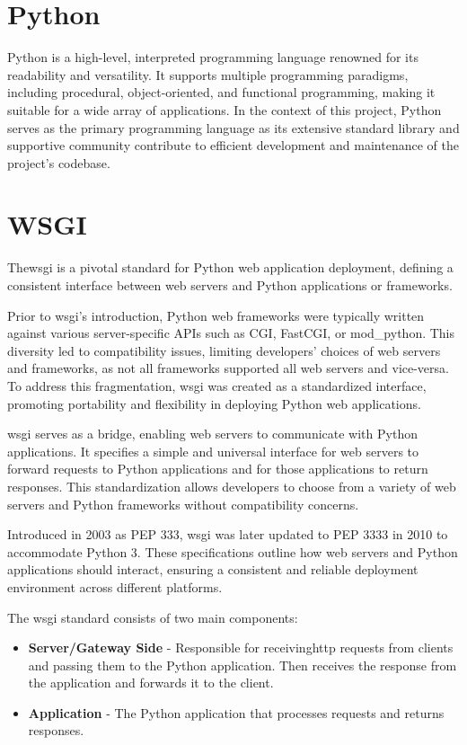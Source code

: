 \section{Python}
Python is a high-level, interpreted programming language renowned for its readability and versatility. It supports 
multiple programming paradigms, including procedural, object-oriented, and functional programming, making it suitable 
for a wide array of applications.
In the context of this project, Python serves as the primary programming language as its extensive standard library 
and supportive community contribute to efficient development and maintenance of the project's codebase.

\section{WSGI}
The\ac{wsgi} is a pivotal standard for Python web application deployment, defining a consistent interface between web 
servers and Python applications or frameworks.

Prior to \ac{wsgi}'s introduction, Python web frameworks were typically written against various server-specific APIs such as 
CGI, FastCGI, or mod\_python. This diversity led to compatibility issues, limiting developers' choices of web servers and 
frameworks, as not all frameworks supported all web servers and vice-versa. To address this fragmentation, \ac{wsgi} was 
created as a standardized interface, promoting portability and flexibility in deploying Python web applications. 

\ac{wsgi} serves as a bridge, enabling web servers to communicate with Python applications. It specifies a simple and universal 
interface for web servers to forward requests to Python applications and for those applications to return responses. 
This standardization allows developers to choose from a variety of web servers and Python frameworks without compatibility 
concerns\cite{pep333}.

Introduced in 2003 as PEP 333, \ac{wsgi} was later updated to PEP 3333 in 2010 to accommodate Python 3. These specifications 
outline how web servers and Python applications should interact, ensuring a consistent and reliable deployment environment 
across different platforms.

The \ac{wsgi} standard consists of two main components:
\begin{itemize}
  \item \textbf{Server/Gateway Side} - Responsible for receiving\ac{http} requests from clients and passing them to the 
  Python application. Then receives the response from the application and forwards it to the client. 
  \item \textbf{Application} - The Python application that processes requests and returns responses.
\end{itemize}

